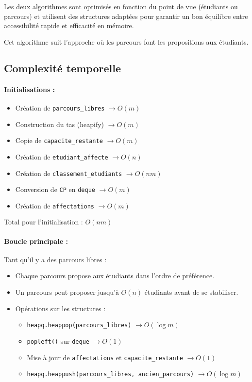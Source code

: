 \documentclass[a4paper,11pt]{article}
\begin{document}
Les deux algorithmes sont optimisés en fonction du point de vue (étudiants ou parcours) et utilisent des structures adaptées pour garantir un bon équilibre entre accessibilité rapide et efficacité en mémoire.

Cet algorithme suit l'approche où les parcours font les propositions aux étudiants.

\subsection{Complexité temporelle}
\paragraph{Initialisations :}
\begin{itemize}
    \item Création de \texttt{parcours\_libres} $\rightarrow O(m)$
    \item Construction du tas (heapify) $\rightarrow O(m)$
    \item Copie de \texttt{capacite\_restante} $\rightarrow O(m)$
    \item Création de \texttt{etudiant\_affecte} $\rightarrow O(n)$
    \item Création de \texttt{classement\_etudiants} $\rightarrow O(nm)$
    \item Conversion de \texttt{CP} en \texttt{deque} $\rightarrow O(m)$
    \item Création de \texttt{affectations} $\rightarrow O(m)$
\end{itemize}
Total pour l'initialisation : $O(nm)$

\paragraph{Boucle principale :} Tant qu'il y a des parcours libres :
\begin{itemize}
    \item Chaque parcours propose aux étudiants dans l'ordre de préférence.
    \item Un parcours peut proposer jusqu'à $O(n)$ étudiants avant de se stabiliser.
    \item Opérations sur les structures :
    \begin{itemize}
        \item \texttt{heapq.heappop(parcours\_libres)} $\rightarrow O(\log m)$
        \item \texttt{popleft()} sur \texttt{deque} $\rightarrow O(1)$
        \item Mise à jour de \texttt{affectations} et \texttt{capacite\_restante} $\rightarrow O(1)$
        \item \texttt{heapq.heappush(parcours\_libres, ancien\_parcours)} $\rightarrow O(\log m)$
    \end{itemize}
\end{itemize}
\end{document}
